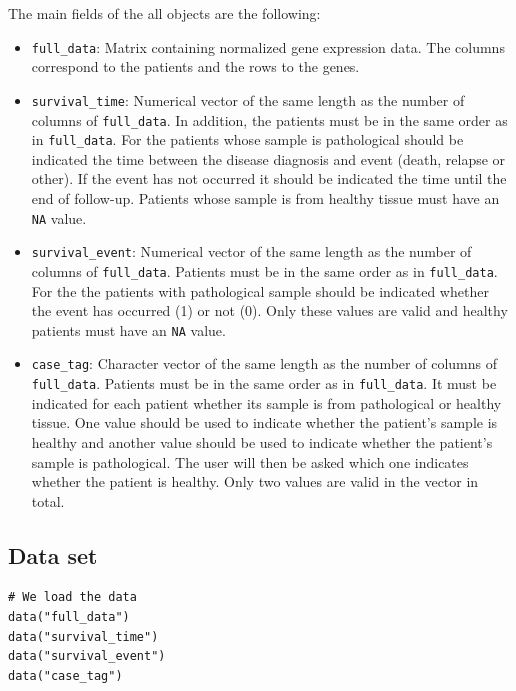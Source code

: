 The main fields of the all objects are the following:

\begin{itemize}
\tightlist
\item
  \texttt{full\_data}: Matrix containing normalized gene expression data. The columns correspond to the patients and the rows to the genes.
\item
  \texttt{survival\_time}: Numerical vector of the same length as the number of columns of \texttt{full\_data}. In addition, the patients must be in the same order as in \texttt{full\_data}. For the patients whose sample is pathological should be indicated the time between the disease diagnosis and event (death, relapse or other). If the event has not occurred it should be indicated the time until the end of follow-up. Patients whose sample is from healthy tissue must have an \texttt{NA} value.
\item
  \texttt{survival\_event}: Numerical vector of the same length as the number of columns of \texttt{full\_data}. Patients must be in the same order as in \texttt{full\_data}. For the the patients with pathological sample should be indicated whether the event has occurred (1) or not (0). Only these values are valid and healthy patients must have an \texttt{NA} value.
\item
  \texttt{case\_tag}: Character vector of the same length as the number of columns of \texttt{full\_data}. Patients must be in the same order as in \texttt{full\_data}. It must be indicated for each patient whether its sample is from pathological or healthy tissue. One value should be used to indicate whether the patient's sample is healthy and another value should be used to indicate whether the patient's sample is pathological. The user will then be asked which one indicates whether the patient is healthy. Only two values are valid in the vector in total.
\end{itemize}

\hypertarget{section3.1}{%
\subsection{Data set}\label{section3.1}}

\begin{verbatim}
# We load the data
data("full_data")
data("survival_time")
data("survival_event")
data("case_tag")
\end{verbatim}

